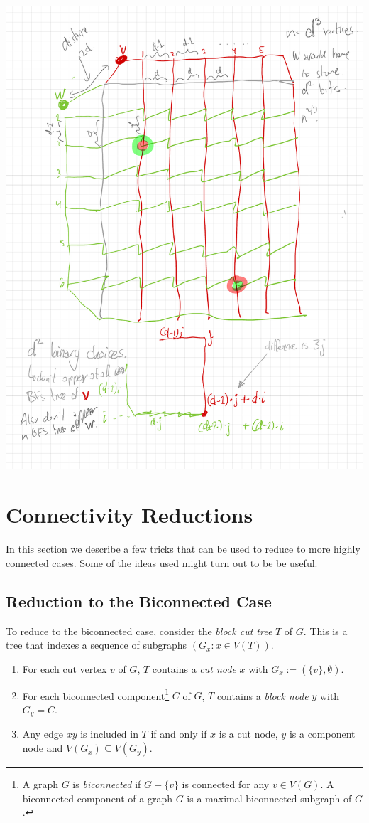 \documentclass{patmorin}
\begin{document}
\begin{center}
    \includegraphics[width=.8\textwidth]{figs/bad-example}
\end{center}


\section{Connectivity Reductions}

In this section we describe a few tricks that can be used to reduce to more highly connected cases. Some of the ideas used might turn out to be be useful.

\subsection{Reduction to the Biconnected Case}

To reduce to the biconnected case, consider the \emph{block cut tree} $T$ of $G$.  This is a tree that indexes a sequence of subgraphs $(G_x:x\in V(T))$.
\begin{enumerate}
    \item For each cut vertex $v$ of $G$, $T$ contains a \emph{cut node} $x$ with $G_x:=(\{v\},\emptyset)$.
    \item For each biconnected component\footnote{A graph $G$ is \emph{biconnected} if $G-\{v\}$ is connected for any $v\in V(G)$.  A biconnected component of a graph $G$ is a maximal biconnected subgraph of $G$.} $C$ of $G$, $T$ contains a \emph{block node} $y$ with $G_y=C$.
    \item Any edge $xy$ is included in $T$ if and only if $x$ is a cut node, $y$ is a component node and $V(G_x)\subseteq V(G_y)$.
\end{enumerate}
\end{document}
